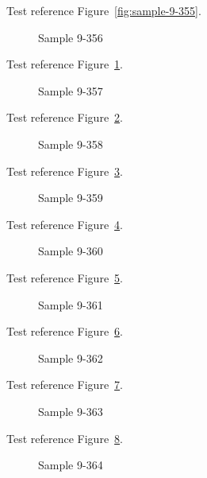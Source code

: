 Test reference Figure~\ref{fig:sample-9-355}.

\begin{figure}[tbhp]
\caption{Sample 9-356}
\label{fig:sample-9-356}
\end{figure}

Test reference Figure~\ref{fig:sample-9-356}.

\begin{figure}[tbhp]
\caption{Sample 9-357}
\label{fig:sample-9-357}
\end{figure}

Test reference Figure~\ref{fig:sample-9-357}.

\begin{figure}[tbhp]
\caption{Sample 9-358}
\label{fig:sample-9-358}
\end{figure}

Test reference Figure~\ref{fig:sample-9-358}.

\begin{figure}[tbhp]
\caption{Sample 9-359}
\label{fig:sample-9-359}
\end{figure}

Test reference Figure~\ref{fig:sample-9-359}.

\begin{figure}[tbhp]
\caption{Sample 9-360}
\label{fig:sample-9-360}
\end{figure}

Test reference Figure~\ref{fig:sample-9-360}.

\begin{figure}[tbhp]
\caption{Sample 9-361}
\label{fig:sample-9-361}
\end{figure}

Test reference Figure~\ref{fig:sample-9-361}.

\begin{figure}[tbhp]
\caption{Sample 9-362}
\label{fig:sample-9-362}
\end{figure}

Test reference Figure~\ref{fig:sample-9-362}.

\begin{figure}[tbhp]
\caption{Sample 9-363}
\label{fig:sample-9-363}
\end{figure}

Test reference Figure~\ref{fig:sample-9-363}.

\begin{figure}[tbhp]
\caption{Sample 9-364}
\label{fig:sample-9-364}
\end{figure}

